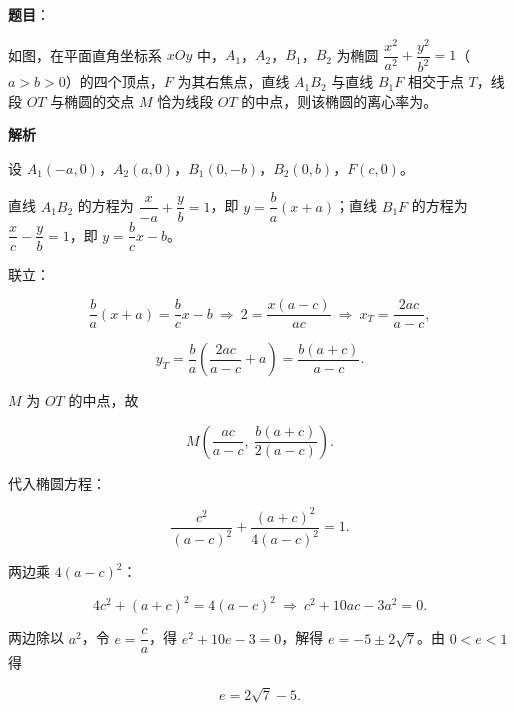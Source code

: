 \begin{answer}

\textbf{题目}：

如图，在平面直角坐标系 $xOy$ 中，$A_1$，$A_2$，$B_1$，$B_2$ 为椭圆 $\dfrac{x^2}{a^2}+\dfrac{y^2}{b^2}=1$（$a>b>0$）的四个顶点，$F$ 为其右焦点，直线 $A_1B_2$ 与直线 $B_1F$ 相交于点 $T$，线段 $OT$ 与椭圆的交点 $M$ 恰为线段 $OT$ 的中点，则该椭圆的离心率为\gkblank{}。
\nopagebreak[4]
\begin{center}\end{center}
\nopagebreak[4]
\textbf{解析}

设 $A_1(-a,0)$，$A_2(a,0)$，$B_1(0,-b)$，$B_2(0,b)$，$F(c,0)$。

直线 $A_1B_2$ 的方程为 $\dfrac x{-a}+\dfrac yb=1$，即 $y=\dfrac ba(x+a)$；直线 $B_1F$ 的方程为 $\dfrac xc-\dfrac yb=1$，即 $y=\dfrac bcx-b$。

联立：

\nopagebreak[4]
\[\frac ba(x+a)=\frac bcx-b\ \Longrightarrow\ 2=\frac{x(a-c)}{ac}\ \Longrightarrow\ x_T=\frac{2ac}{a-c},\]

\nopagebreak[4]
\[y_T=\frac ba\left(\frac{2ac}{a-c}+a\right)=\frac{b(a+c)}{a-c}.\]

$M$ 为 $OT$ 的中点，故

\nopagebreak[4]
\[M\left(\frac{ac}{a-c},\ \frac{b(a+c)}{2(a-c)}\right).\]

代入椭圆方程：

\nopagebreak[4]
\[\frac{c^2}{(a-c)^2}+\frac{(a+c)^2}{4(a-c)^2}=1 .\]

两边乘 $4(a-c)^2$：

\nopagebreak[4]
\[4c^2+(a+c)^2=4(a-c)^2\ \Longrightarrow\ c^2+10ac-3a^2=0 .\]

两边除以 $a^2$，令 $e=\dfrac ca$，得 $e^2+10e-3=0$，解得 $e=-5\pm2\sqrt7$。由 $0<e<1$ 得

\nopagebreak[4]
\[e=2\sqrt7-5 .\]


\end{answer}
